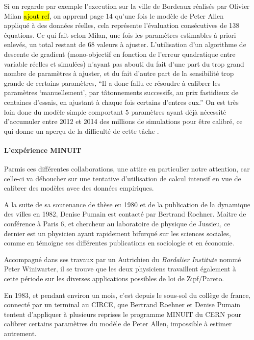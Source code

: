Si on regarde par exemple l'execution sur la ville de Bordeaux réalisés par Olivier Milan \hl{ajout ref}, on apprend page 14 qu'une fois le modèle de Peter Allen appliqué à des données réelles, cela représente l'évaluation consécutives de 138 équations. Ce qui fait selon Milan, une fois les paramètres estimables à priori enlevés, un total restant de 68 valeurs à ajuster. L'utilisation d'un algorithme de descente de gradient (mono-objectif en fonction de l'erreur quadratique entre variable réelles et simulées) n'ayant pas abouti du fait d'une part du trop grand nombre de paramètres à ajuster, et du fait d'autre part de la sensibilité trop grande de certains paramètres, \enquote{Il a donc fallu ce résoudre à calibrer les paramètres \enquote{manuellement}, par tâtonnements successifs, au prix fastidieux de centaines d'essais, en ajustant à chaque fois certains d'entres eux.}  On est très loin donc du modèle simple comportant 5 paramètres ayant déjà nécessité d'accumuler entre 2012 et 2014 des millions de simulations pour être calibré, ce qui donne un aperçu de la difficulté de cette tâche \autocite{Schmitt2015}.


\paragraph{L'expérience MINUIT}

Parmis ces différentes collaborations, une attire en particulier notre attention, car celle-ci va déboucher sur une tentative d’utilisation de calcul intensif en vue de calibrer des modèles avec des données empiriques.

A la suite de sa soutenance de thèse en 1980 et de la publication de la dynamique des villes en 1982, Denise Pumain est contacté par Bertrand Roehner. Maitre de conférence à Paris 6, et chercheur au laboratoire de physique de Jussieu, ce dernier est un physicien ayant rapidement bifurqué sur les sciences sociales, comme en témoigne ses différentes publications en sociologie et en économie.

Accompagné dans ses travaux par un Autrichien du \textit{Bordalier Institute} nommé Peter Winiwarter, il se trouve que les deux physiciens travaillent également à cette période sur les diverses applications possibles de loi de Zipf/Pareto.

En 1983, et pendant environ un mois, c’est depuis le sous-sol du collège de france, connecté par un terminal au CIRCE, que Bertrand Roehner et Denise Pumain tentent d’appliquer à plusieurs reprises le programme MINUIT du CERN pour calibrer certains paramètres du modèle de Peter Allen, impossible à estimer autrement.

